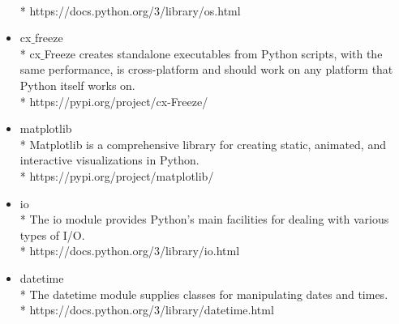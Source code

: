 \begin{itemize}
		\\* https://docs.python.org/3/library/os.html
	\item cx$\_$freeze
		\\* cx$\_$Freeze creates standalone executables from Python scripts, with the same performance, is cross-platform and should work on any platform that Python itself works on.
		\\* https://pypi.org/project/cx-Freeze/
	\item matplotlib
		\\* Matplotlib is a comprehensive library for creating static, animated, and interactive visualizations in Python.
		\\* https://pypi.org/project/matplotlib/
	\item io
		\\* The io module provides Python’s main facilities for dealing with various types of I/O.
		\\* https://docs.python.org/3/library/io.html
	\item datetime
		\\* The datetime module supplies classes for manipulating dates and times.
		\\* https://docs.python.org/3/library/datetime.html
\end{itemize}




